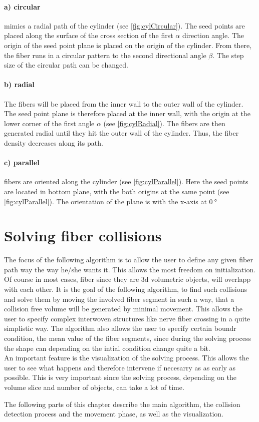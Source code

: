 \paragraph{a) circular} mimics a radial path of the cylinder (see \cref{fig:cylCircular}).
The seed points are placed along the surface of the cross section of the first $\alpha$ direction angle.
The origin of the seed point plane is placed on the origin of the cylinder.
From there, the fiber runs in a circular pattern to the second directional angle $\beta$.
The step size of the circular path can be changed.
% 
\paragraph{b) radial} The fibers will be placed from the inner wall to the outer wall of the cylinder.
The seed point plane is therefore placed at the inner wall, with the origin at the lower corner of the first angle $\alpha$ (see \cref{fig:cylRadial}).
The fibers are then generated radial until they hit the outer wall of the cylinder.
Thus, the fiber density decreases along its path.
% 
\paragraph{c) parallel} fibers are oriented along the cylinder (see \cref{fig:cylParallel}).
Here the seed points are located in bottom plane, with the both origins at the same point (see \cref{fig:cylParallel}). The orientation of the plane is with the x-axis at $\SI{0}{\degree}$
% 
% 
% 
\section{Solving fiber collisions}
\label{sec:Solver}
% 
% 
The focus of the following algorithm is to allow the user to define any given fiber path way the way he/she wants it.
This allows the most freedom on initialization.
Of course in most cases, fiber since they are 3d volumetric objects, will overlapp with each other.
It is the goal of the following algorithm, to find such collisions and solve them by moving the involved fiber segment in such a way, that a collision free volume will be generated by minimal movement.
% 
This allows the user to specify complex interwoven structures like nerve fiber crossing in a quite simplistic way.
% 
The algorithm also allows the user to specify certain boundr condition, \eg{} the mean value of the fiber segments, since during the solving process the shape can depending on the intial condition change quite a bit.
\\
An important feature is the visualization of the solving process.
This allows the user to see what happens and therefore intervene if necesarry as as early as possible.
This is very important since the solving process, depending on the volume slice and number of objects, can take a lot of time.
\par
% 
The following parts of this chapter describe the main algorithm, \ie{} the collision detection process and the movement phase, as well as the visualization.
% 
%
